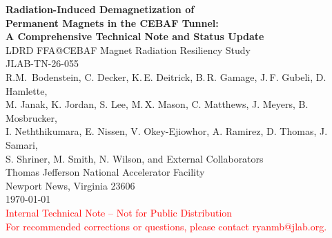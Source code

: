 \documentclass[11pt,letterpaper]{article}
\begin{document}
\begin{titlepage}
\centering
\vspace*{2cm}
{\huge\bfseries Radiation-Induced Demagnetization of\\
Permanent Magnets in the CEBAF Tunnel:\\[6pt]
A Comprehensive Technical Note and Status Update}\\[1.5cm]
{\Large LDRD FFA@CEBAF Magnet Radiation Resiliency Study\\JLAB-TN-26-055}\\[2cm]
{\large R.M.\ Bodenstein, C. Decker, K.\,E. Deitrick, B.\,R. Gamage, J.\,F. Gubeli, D. Hamlette,\\ M. Janak, K. Jordan, S. Lee, M.\,X. Mason, C. Matthews, J. Meyers, B. Mosbrucker,\\ I. Neththikumara,  E. Nissen, V. Okey-Ejiowhor, A. Ramirez, D. Thomas, J. Samari,\\ S. Shriner, M. Smith, N. Wilson, and External Collaborators}\\[2.5cm]
{\large Thomas Jefferson National Accelerator Facility}\\[0.5cm]
{\large Newport News, Virginia 23606}\\[3cm]
{\large\today}\\[1.5cm]
{\large\textcolor{red}{Internal Technical Note -- Not for Public Distribution\\For recommended corrections or questions, please contact ryanmb@jlab.org.}}\\[2cm]


\end{titlepage}
\end{document}
